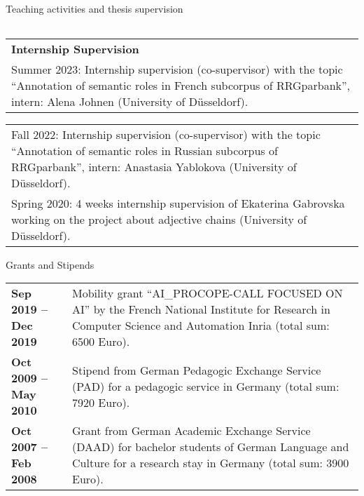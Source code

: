 \documentclass{resume} %
\begin{document}
\begin{rSection}{Teaching activities and thesis supervision}
\begin{tabular}{p{17cm}}
\end{tabular}


\hspace{-20pt}
\begin{tabular}{p{17cm}}
	{\bf Internship Supervision}  \\[10pt]
	Summer 2023: Internship supervision (co-supervisor) with the topic “Annotation of semantic roles in French subcorpus of RRGparbank”, intern: Alena Johnen (University of D{\"u}sseldorf). \\[5pt]
	
\end{tabular}

\begin{tabular}{p{17cm}}
		
    Fall 2022: Internship supervision (co-supervisor) with the topic “Annotation of semantic roles in Russian subcorpus of RRGparbank”, intern: Anastasia Yablokova (University of D{\"u}sseldorf). \\[5pt]
    
	Spring 2020: 4 weeks internship supervision of Ekaterina Gabrovska working on the project about adjective chains (University of D{\"u}sseldorf). 
	
	
\end{tabular}

\end{rSection}


\begin{rSection}{Grants and Stipends} 

\hspace{-20pt}
\begin{tabular}{p{4cm}p{13cm}}

{\bf Sep 2019 -- Dec 2019} &  Mobility grant ``AI\_PROCOPE-CALL FOCUSED ON AI'' by the French National Institute for Research in Computer Science and Automation Inria (total sum: 6500 Euro).\\[5pt]
{\bf Oct 2009 -- May 2010} &  Stipend from German Pedagogic Exchange Service (PAD) for a pedagogic service in Germany (total sum: 7920 Euro).\\[5pt]
{\bf Oct 2007 -- Feb 2008} &  Grant from German Academic Exchange Service (DAAD) for bachelor students of German Language and Culture for a research stay in Germany (total sum: 3900 Euro).
 
\end{tabular}

\end{rSection}
\end{document}
